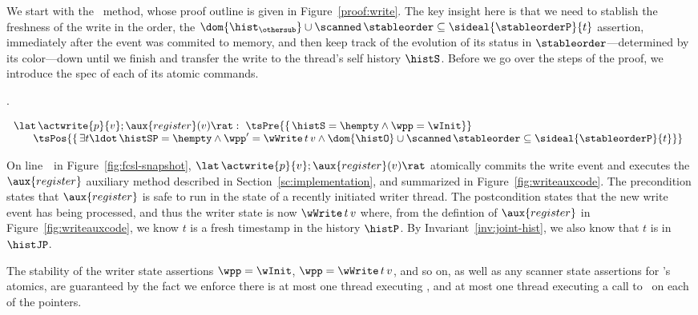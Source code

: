 We start with the \jywrite\ method, whose proof outline is given in
Figure~\ref{proof:write}. The key insight here is that we need to
stablish the freshness of the write in the order, \ie the $
\dom{\hist_\othersub} \cup \scanned\, \stableorder \subseteq
\sideal{\stableorderP}{t}$ assertion, immediately after the event was
commited to memory, and then keep track of the evolution of its status
in $\stableorder$---determined by its color---down until we finish and
transfer the write to the thread's self history $\histS$. Before we go
over the steps of the proof, we introduce the spec of each of its
atomic commands.

.

\[
\begin{array}{l}
  \lat\,\actwrite{p}{v}; \aux{register}(v)\rat : \
                 {\tsPre{\{\, \histS = \hempty \wedge \wpp = \wInit\}}} \\
  ~~~~ \begin{array}[t]{l}
        \tsPos{\{\, \exists t\ldot\, \histSP = \hempty \wedge
          \wpp' = \wWrite\, t\, v \wedge
          \dom{\histO} \cup \scanned\, \stableorder
          \subseteq \sideal{\stableorderP}{t}\}}
  \end{array}
\end{array}
\]



On line~\lineWrtWrt~in Figure~\ref{fig:fcsl-snapshot},
$\lat\,\actwrite{p}{v}; \aux{register}(v)\rat$ atomically commits the
write event and executes the $\aux{register}$ auxiliary method
described in Section~\ref{sc:implementation}, and summarized in
Figure~\ref{fig:writeauxcode}. The precondition states that
$\aux{register}$ is safe to run in the state of a recently initiated
writer thread. The postcondition states that the new write event has
being processed, and thus the writer state is now $\wWrite\, t\, v$
where, from the defintion of $\aux{register}$ in
Figure~\ref{fig:writeauxcode}, we know $t$ is a fresh timestamp in the
history $\histP$. By Invariant~\ref{inv:joint-hist}, we also know
that $t$ is in $\histJP$.



The stability of the writer state assertions $\wpp = \wInit$, $\wpp
= \wWrite\, t\, v$, and so on, as well as any scanner state assertions
for \jyscan's atomics, are guaranteed by the fact we enforce there is
at most one thread executing \jyscan, and at most one thread executing
a call to \jywrite~on each of the pointers.


